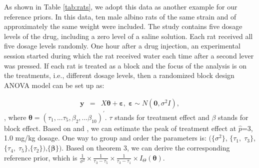 \documentclass[Proceedings]{ascelike}
\begin{document}
As shown in Table \ref{tab:rats}, we adopt this data as another
example for our reference priors. In this data, ten male albino rats
of the same strain and of approximately the same weight were
included. The study contains five dosage levels of the drug, including
a zero level of a saline solution. Each rat received all five dosage
levels randomly. One hour after a drug injection, an experimental
session started during which the rat received water each time after a
second lever was pressed. If each rat is treated as a block and the
focus of the analysis is on the treatments, i.e., different dosage
levels, then a randomized block design ANOVA model can be set up as:

\begin{eqnarray}
  \pmb{y}
    & = &
X\pmb{\theta}+\pmb{\varepsilon},\; \pmb{\varepsilon}{\sim}N(\pmb{0},\sigma^2 I),
\nonumber
\end{eqnarray}
, where ${\boldsymbol\theta}=(\tau_1,...\tau_5,\beta_2,...\beta_{10})^\prime$. $\tau$ stands for treatment effect and $\beta$ stands for block effect.
Based on \cite{Mack1981} and \cite{Lim1997}, we can estimate the peak of treatment effect at $\hat{p}$=3, 1.0 mg/kg dosage. One way to group and order the parameters is:
$(\{\sigma^2\}$, $\{\tau_1,\;\tau_3\}$, $\{\tau_4,\; \tau_5\}$,$\{\tau_2\})$,$\{\boldsymbol\beta\})$. Based on theorem 3, we can derive the corresponding reference prior, which is $\frac{1}{\sigma^2} \times \frac{1}{\tau_3-\tau_5} \times \frac{1}{\tau_3-\tau_1}\times I_{\Theta}(\boldsymbol{\theta})$.
\end{document}
